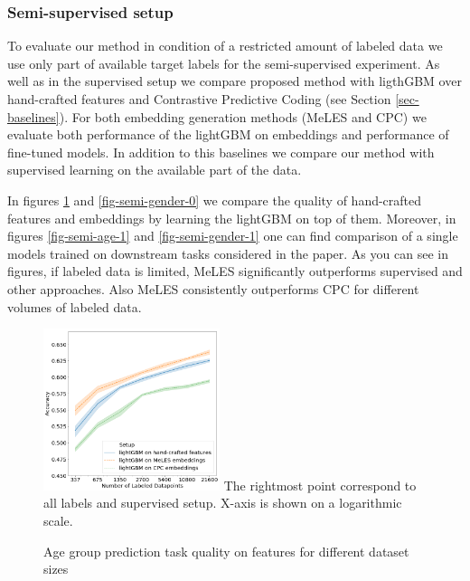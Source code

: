 \documentclass[sigconf, anonymous]{acmart}
\begin{document}
\subsubsection{Semi-supervised setup} \label{sec-semi}

To evaluate our method in condition of a restricted amount of labeled data we use only part of available target labels for the semi-supervised experiment.
As well as in the supervised setup we compare proposed method with ligthGBM over hand-crafted features and Contrastive Predictive Coding (see Section \ref{sec-baselines}).
For both embedding generation methods (MeLES and CPC) we evaluate both performance of the lightGBM on embeddings and performance of fine-tuned models.
In addition to this baselines we compare our method with supervised learning on the available part of the data.

In figures \ref{fig-semi-age-0} and \ref{fig-semi-gender-0} we compare the quality of hand-crafted features and embeddings by learning the lightGBM on top of them. Moreover, in figures \ref{fig-semi-age-1} and \ref{fig-semi-gender-1} one can find comparison of a single models trained on downstream tasks considered in the paper. As you can see in figures, if labeled data is limited, MeLES significantly outperforms supervised and other approaches. Also MeLES consistently outperforms CPC for different volumes of labeled data.

\begin{figure}[h]
  \caption{Age group prediction task quality on features for different dataset sizes}
  \includegraphics[width=0.46\textwidth]{figures/ss_age_0.png}
  \small{The rightmost point correspond to all labels and supervised setup. X-axis is shown on a logarithmic scale.}
  \label{fig-semi-age-0}
\end{figure}
\end{document}
